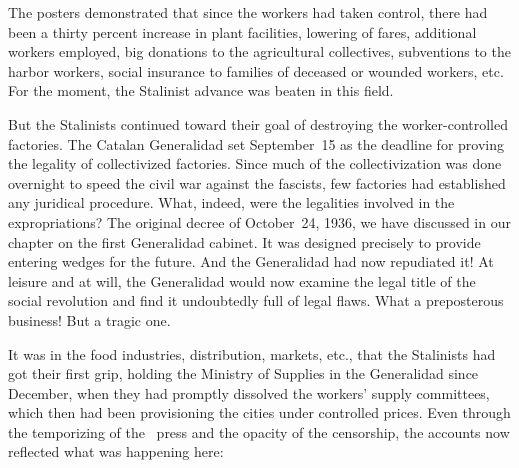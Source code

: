 \medskip

The posters demonstrated that since the workers had taken control, there had been a thirty percent increase in plant facilities, lowering of fares, additional workers employed, big donations to the agricultural collectives, subventions to the harbor workers, social insurance to families of deceased or wounded workers, etc. For the moment, the Stalinist advance was beaten in this field.

But the Stalinists continued toward their goal of destroying the worker-controlled factories. The Catalan Generalidad set September~15 as the deadline for proving the legality of collectivized factories. Since much of the collectivization was done overnight to speed the civil war against the fascists, few factories had established any juridical procedure. What, indeed, were the legalities involved in the expropriations? The original decree of October~24, 1936, we have discussed in our chapter on the first Generalidad cabinet. It was designed precisely to provide entering wedges for the future. And the Generalidad had now repudiated it! At leisure and at will, the Generalidad would now examine the legal title of the social revolution and find it undoubtedly full of legal flaws. What a preposterous business! But a tragic one.

It was in the food industries, distribution, markets, etc., that the Stalinists had got their first grip, holding the Ministry of Supplies in the Generalidad since December\kn, when they had promptly dissolved the workers’ supply committees, which then had been provisioning the cities under controlled prices. Even through the temporizing of the \CNT\ press and the opacity of the censorship, the accounts now reflected what was happening here:


